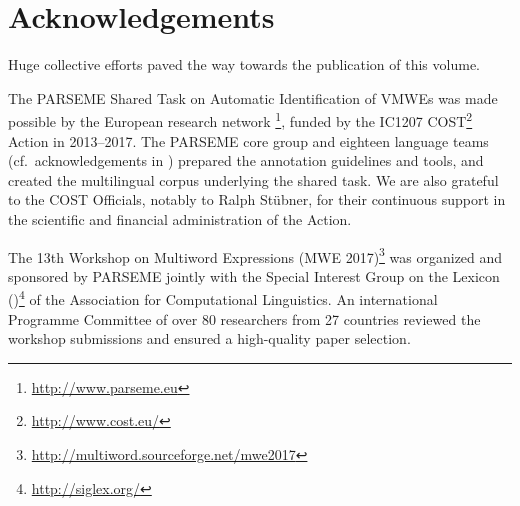 \documentclass[output=paper,modfonts,]{langscibook}
\begin{document}





\section{Acknowledgements}
Huge collective efforts paved the way towards the publication of this volume. 

The  PARSEME Shared Task on Automatic Identification of VMWEs was made possible by the European research network \footnote{\url{http://www.parseme.eu}}, funded by the IC1207 COST\footnote{\url{http://www.cost.eu/}} Action in 2013--2017. The PARSEME core group and eighteen language teams (cf.~acknowledgements in ) prepared the annotation guidelines and tools, and created the multilingual corpus underlying the shared task. We are also grateful to the COST Officials, notably to Ralph Stübner, for their %
continuous support in the scientific and financial administration of the Action. 

The 13th Workshop on Multiword Expressions (MWE 2017)\footnote{\url{http://multiword.sourceforge.net/mwe2017}}  was organized and sponsored by PARSEME jointly with the Special Interest Group on the Lexicon ()\footnote{\url{http://siglex.org/}} of the Association for Computational Linguistics. An international Programme Committee of over 80 researchers from 27 countries reviewed the workshop submissions and ensured a high-quality paper selection.
\end{document}
